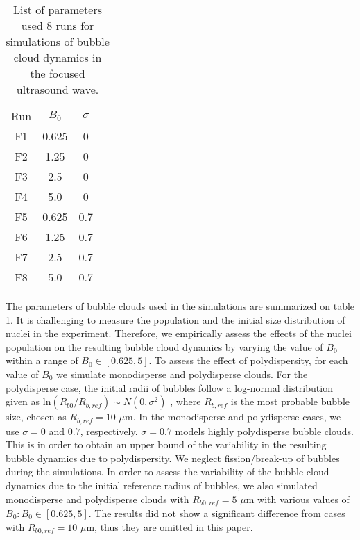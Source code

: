 \documentclass{jfm}
\begin{document}
\begin{table}
 \begin{center}
  \begin{tabular}{cccc}
    Run & $B_0$  & $\sigma$ \\[3pt]
     F1 & 0.625  & 0\\
     F2 & 1.25  & 0\\
     F3 & 2.5  & 0\\ 
     F4 & 5.0  & 0\\
     F5 & 0.625  & 0.7\\
     F6 & 1.25  & 0.7\\
     F7 & 2.5  & 0.7\\ 
     F8 & 5.0  & 0.7\\
 \end{tabular}
  \caption{List of parameters used 8 runs for simulations of bubble cloud dynamics in the focused ultrasound wave.
  }{\label{tab:pm}}
 \end{center}
\end{table}
The parameters of bubble clouds used in the simulations are summarized on table \ref{tab:pm}.
It is challenging to measure the population and the initial size distribution of nuclei in the experiment.
Therefore, we empirically assess the effects of the nuclei population on the resulting bubble cloud dynamics by varying the value of $B_0$ within a range of $B_0\in[0.625,5]$.
To assess the effect of polydispersity, for each value of $B_0$ we simulate monodisperse and polydisperse clouds.
For the polydisperse case, the initial radii of bubbles follow a log-normal distribution given as ${\mathrm{ln}}(R_{b0}/R_{b,ref})\sim N(0,\sigma^2)$ \citep{Ando11}, where $R_{b,ref}$ is the most probable bubble size, chosen as $R_{b,ref}=10$ $\mu$m. In the monodisperse and polydisperse cases, we use $\sigma=0$ and $0.7$, respectively. $\sigma=0.7$ models highly polydisperse bubble clouds.
This is in order to obtain an upper bound of the variability in the resulting bubble dynamics due to polydispersity. We neglect fission/break-up of bubbles during the simulations.
In order to assess the variability of the bubble cloud dynamics due to the initial reference radius of bubbles, we also simulated monodisperse and polydisperse clouds with $R_{b0,ref}=5$ $\mu$m with various values of $B_0:B_0\in[0.625,5]$.
The results did not show a significant difference from cases with $R_{b0,ref}=10$ $\mu$m, thus they are omitted in this paper.
\end{document}
